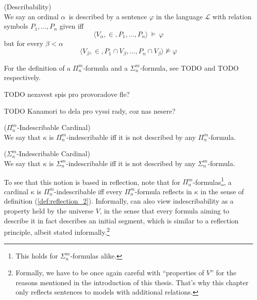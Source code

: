 
\begin{definition}{(Describability)}\label{def:describability}\\
We say an ordinal $\alpha$ is described by a sentence $\varphi$ in the language $\mathscr{L}$ with relation symbols $P_1, \ldots, P_n$ given iff
\begin{equation}
\langle V_\alpha, \in, P_1, \ldots, P_n \rangle~\models~\varphi
\end{equation}
but for every $\beta < \alpha$
\begin{equation}
\langle V_\beta, \in, P_1 \cap V_\beta, \ldots, P_n \cap V_\beta \rangle \not\models \varphi
\end{equation}
\end{definition}

For the definition of a $\Pi^m_n$-formula and a $\Sigma^m_n$-formula, see TODO and TODO respectively.

TODO nezavest spis pro provoradove fle?

TODO Kanamori to dela pro vyssi rady, coz nas nesere?

\begin{definition}{($\Pi^m_n$-Indescribable Cardinal)}\label{def:pi_mn_indescribable}\\
We say that $\kappa$ is $\Pi^m_n$-indescribable iff it is not described by any $\Pi^m_n$-formula.
\end{definition}
\begin{definition}{($\Sigma^m_n$-Indescribable Cardinal)}\label{def:sigma_mn_indescribable}\\
We say that $\kappa$ is $\Sigma^m_n$-indescribable iff it is not described by any $\Sigma^m_n$-formula.
\end{definition}

To see that this notion is based in reflection, note that for $\Pi^m_n$-formulas\footnote{This holds for $\Sigma^m_n$-formulas alike.}, a cardinal $\kappa$ is $\Pi^m_n$-indescribable iff every $\Pi^m_n$-formula reflects in $\kappa$ in the sense of definition (\ref{def:reflection_2}). Informally, can also view indescribability as a property held by the universe $V$, in the sense that every formula aiming to describe it in fact describes an initial segment, which is similar to a reflection principle, albeit stated informally.\footnote{Formally, we have to be once again careful with ``properties of $V$'' for the reasons mentioned in the introduction of this thesis. That's why this chapter only reflects sentences to models with additional relations.}

